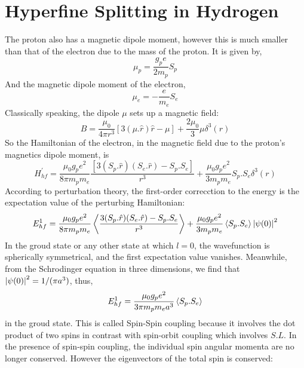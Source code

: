 \section{Hyperfine Splitting in Hydrogen}
The proton also has a magnetic dipole moment, however this is much smaller than that of the electron due to the mass of the proton. It is given by,
\begin{equation}
	\mu_{p} = \frac{g_{p} e}{2 m_{p}}S_{p}
\end{equation}
And the magnetic dipole moment of the electron,
\begin{equation}
\mu_{e} = -\frac{e}{m_{e}}S_{e}
\end{equation}
Classically speaking, the dipole $\mu$ sets up a magnetic field:
\begin{equation}
	B = \frac{\mu_{0}}{4 \pi r^{3}}[3(\mu . \hat{r})\hat{r} - \mu] + \frac{2 \mu_{0}}{3} \mu \delta^{3}(r)
\end{equation}
So the Hamiltonian of the electron, in the magnetic field due to the proton's magnetics dipole moment, is
\begin{equation}
	H^{'}_{hf} = \frac{\mu_{0} g_{p} e^{2}}{8 \pi m_{p} m_{e}}\frac{[3(S_{p}. \hat{r})(S_{e}. \hat{r}) - S_{p}.S_{e}]}{r^{3}} + \frac{\mu_{0} g_{p} e^{2}}{3 m_{p} m_{e}}S_{p}.S_{e} \delta^{3}(r)
\end{equation}
According to perturbation theory, the first-order correcction to the energy is the expectation value of the perturbing Hamiltonian:
\begin{equation}
	E^{1}_{hf} = \frac{\mu_{0} g_{p} e^{2}}{8 \pi m_{p} m_{e}} \expval{\frac{3(S_{p}.\hat{r})(S_{e}.\hat{r}) - S_{p}.S_{e}}{r^{3}}} + \frac{\mu_{0} g_{p} e^{2}}{3 m_{p} m_{e}}\expval{S_{p}.S_{e}}\abs{\psi(0)}^{2}
\end{equation}
In the groud state or any other state at which $l = 0$, the wavefunction is spherically symmetrical, and the first expectation value vanishes. Meanwhile, from the Schrodinger equation in three dimensions, we find that $\abs{\psi(0)}^{2} = 1/(\pi a^{3})$, thus,
\begin{equation}
E^{1}_{hf} = \frac{\mu_{0} g_{p} e^{2}}{3 \pi m_{p}m_{e} a^{3}}\expval{S_{p}.S_{e}}
\end{equation}
in the groud state. This is called Spin-Spin coupling because it involves the dot product of two spins in contrast with spin-orbit coupling which involves $S.L$. In the presence of spin-spin coupling, the individual spin angular momenta are no longer conserved. However the eigenvectors of the total spin is conserved:
